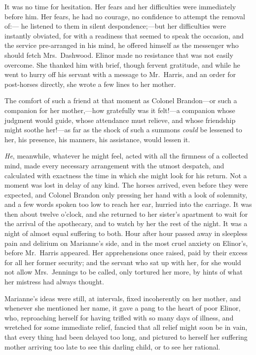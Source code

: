 It was no time for hesitation.  Her fears and her
difficulties were immediately before him.  Her fears,
he had no courage, no confidence to attempt the removal of:---%
he listened to them in silent despondence;---but her
difficulties were instantly obviated, for with a readiness
that seemed to speak the occasion, and the service
pre-arranged in his mind, he offered himself as the
messenger who should fetch Mrs.\ Dashwood.  Elinor made no
resistance that was not easily overcome.  She thanked him
with brief, though fervent gratitude, and while he went
to hurry off his servant with a message to Mr.\ Harris, and
an order for post-horses directly, she wrote a few lines
to her mother.

The comfort of such a friend at that moment as Colonel
Brandon---or such a companion for her mother,---how gratefully
was it felt!---a companion whose judgment would guide,
whose attendance must relieve, and whose friendship might
soothe her!---as far as the shock of such a summons \emph{could}
be lessened to her, his presence, his manners, his assistance,
would lessen it.

\emph{He}, meanwhile, whatever he might feel, acted with all
the firmness of a collected mind, made every necessary
arrangement with the utmost despatch, and calculated
with exactness the time in which she might look for
his return.  Not a moment was lost in delay of any kind.
The horses arrived, even before they were expected,
and Colonel Brandon only pressing her hand with a look
of solemnity, and a few words spoken too low to reach her ear,
hurried into the carriage.  It was then about twelve
o'clock, and she returned to her sister's apartment to wait
for the arrival of the apothecary, and to watch by her
the rest of the night.  It was a night of almost equal
suffering to both.  Hour after hour passed away in sleepless
pain and delirium on Marianne's side, and in the most
cruel anxiety on Elinor's, before Mr.\ Harris appeared.
Her apprehensions once raised, paid by their excess for all
her former security; and the servant who sat up with her,
for she would not allow Mrs.\ Jennings to be called,
only tortured her more, by hints of what her mistress
had always thought.

Marianne's ideas were still, at intervals,
fixed incoherently on her mother, and whenever she
mentioned her name, it gave a pang to the heart of
poor Elinor, who, reproaching herself for having trifled
with so many days of illness, and wretched for some
immediate relief, fancied that all relief might soon
be in vain, that every thing had been delayed too long,
and pictured to herself her suffering mother arriving
too late to see this darling child, or to see her rational.


